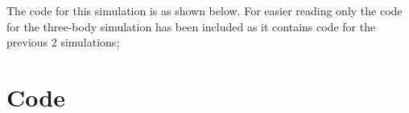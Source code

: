 The code for this simulation is as shown below. For easier reading only the code for the three-body simulation has been included as it contains code for the previous 2 simulations;

\section{Code}
